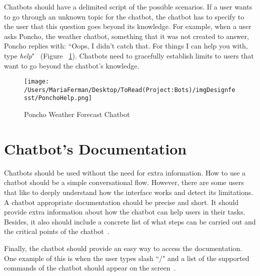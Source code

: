 \documentclass[a4paper,10pt]{article}
\begin{document}
Chatbots should have a delimited script of the possible scenarios. If a user wants to go through an unknown topic for the chatbot, the chatbot has to specify to the user that this question goes beyond its knowledge. For example, when a user asks Poncho, the weather chatbot, something that it was not created to answer, Poncho replies with: ``Oops, I didn't catch that. For things I can help you with, type \textit{help}"~\cite{HeuristicsWebPage} (Figure ~\ref{FigureCommunicationCapabilities}). Chatbots need to gracefully establish limits to users that want to go beyond the chatbot's knowledge.  

\begin{figure}
\centering
\texttt{[image: /Users/MariaFerman/Desktop/ToRead(Project:Bots)/imgDesignfesst/PonchoHelp.png]}
\caption{Poncho Weather Forecast Chatbot}
\label{FigureCommunicationCapabilities}
\end{figure}

\section{Chatbot's Documentation}

Chatbots should be used without the need for extra information. How to use a chatbot should be a simple conversational flow. However, there are some users that like to deeply understand how the interface works and detect its limitations. A chatbot appropriate documentation should be precise and short. It should provide extra information about how the chatbot can help users in their tasks. Besides, it also should include a concrete list of what steps can be carried out and the critical points of the chatbot~\cite{HeuristicsWebPage}. 

Finally, the chatbot should provide an easy way to access the documentation. One example of this is when the user types slash ``/" and a list of the supported commands of the chatbot should appear on the screen~\cite{botfather}.  


\medskip


\end{document}
